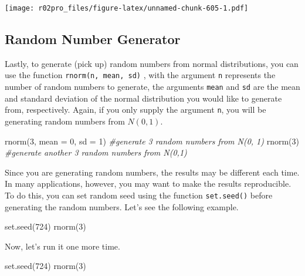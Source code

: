 \documentclass[
]{book}
\newenvironment{Shaded}{\begin{snugshade}}{\end{snugshade}}
\newcommand{\AttributeTok}[1]{\textcolor[rgb]{0.77,0.63,0.00}{#1}}
\newcommand{\CommentTok}[1]{\textcolor[rgb]{0.56,0.35,0.01}{\textit{#1}}}
\newcommand{\DecValTok}[1]{\textcolor[rgb]{0.00,0.00,0.81}{#1}}
\newcommand{\FunctionTok}[1]{\textcolor[rgb]{0.00,0.00,0.00}{#1}}
\newcommand{\NormalTok}[1]{#1}
\begin{document}
\texttt{[image: r02pro\_files/figure-latex/unnamed-chunk-605-1.pdf]}

\hypertarget{rng}{%
\subsection{Random Number Generator}\label{rng}}

Lastly, to generate (pick up) random numbers from normal distributions, you can use the function \texttt{rnorm(n,\ mean,\ sd)} , with the argument \texttt{n} represents the number of random numbers to generate, the arguments \texttt{mean} and \texttt{sd} are the mean and standard deviation of the normal distribution you would like to generate from, respectively. Again, if you only supply the argument \texttt{n}, you will be generating random numbers from \(N(0,1)\).

\begin{Shaded}
\begin{Highlighting}[]
\FunctionTok{rnorm}\NormalTok{(}\DecValTok{3}\NormalTok{, }\AttributeTok{mean =} \DecValTok{0}\NormalTok{, }\AttributeTok{sd =} \DecValTok{1}\NormalTok{) }\CommentTok{\#generate 3 random numbers from N(0, 1)}
\FunctionTok{rnorm}\NormalTok{(}\DecValTok{3}\NormalTok{) }\CommentTok{\#generate another 3 random numbers from N(0,1)}
\end{Highlighting}
\end{Shaded}

Since you are generating random numbers, the results may be different each time. In many applications, however, you may want to make the results reproducible. To do this, you can set random seed using the function \texttt{set.seed()} before generating the random numbers. Let's see the following example.

\begin{Shaded}
\begin{Highlighting}[]
\FunctionTok{set.seed}\NormalTok{(}\DecValTok{724}\NormalTok{)}
\FunctionTok{rnorm}\NormalTok{(}\DecValTok{3}\NormalTok{) }
\end{Highlighting}
\end{Shaded}

Now, let's run it one more time.

\begin{Shaded}
\begin{Highlighting}[]
\FunctionTok{set.seed}\NormalTok{(}\DecValTok{724}\NormalTok{)}
\FunctionTok{rnorm}\NormalTok{(}\DecValTok{3}\NormalTok{) }
\end{Highlighting}
\end{Shaded}
\end{document}
